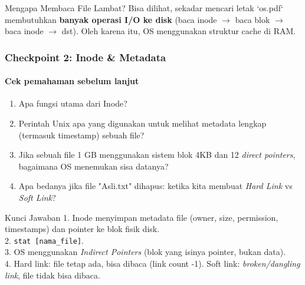 \documentclass[t,aspectratio=169,xcolor=dvipsnames]{beamer}
\begin{document}
\begin{frame}[shrink=10]

    \vspace{0.5cm}
    \begin{alertblock}{Mengapa Membaca File Lambat?}
        Bisa dilihat, sekadar mencari letak `os.pdf` membutuhkan \textbf{banyak operasi I/O ke disk} (baca inode $\to$ baca blok $\to$ baca inode $\to$ dst). Oleh karena itu, OS menggunakan struktur cache di RAM.
    \end{alertblock}
\end{frame}

\begin{frame}
    \frametitle{Checkpoint 2: Inode \& Metadata}
    \framesubtitle{Cek pemahaman sebelum lanjut}
    \small
    \begin{enumerate}
        \item Apa fungsi utama dari Inode?
        \item Perintah Unix apa yang digunakan untuk melihat metadata lengkap (termasuk timestamp) sebuah file?
        \item Jika sebuah file 1 GB menggunakan sistem blok 4KB dan 12 \textit{direct pointers}, bagaimana OS menemukan sisa datanya?
        \item Apa bedanya jika file "Asli.txt" dihapus: ketika kita membuat \textit{Hard Link} vs \textit{Soft Link}?
    \end{enumerate}

    \begin{block}{Kunci Jawaban}
        \scriptsize
        1. Inode menyimpan metadata file (owner, size, permission, timestamps) dan pointer ke blok fisik disk.\\
        2. \texttt{stat [nama\_file]}.\\
        3. OS menggunakan \textit{Indirect Pointers} (blok yang isinya pointer, bukan data).\\
        4. Hard link: file tetap ada, bisa dibaca (link count -1). Soft link: \textit{broken/dangling link}, file tidak bisa dibaca.
    \end{block}
\end{frame}



\end{document}
